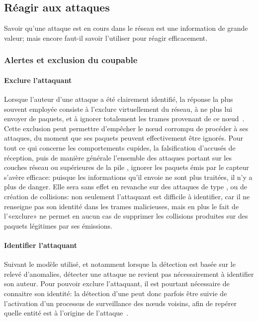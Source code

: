 \subsection{Réagir aux attaques}
Savoir qu'une attaque est en cours dans le réseau est une information de grande valeur; mais encore faut-il savoir l'utiliser pour réagir efficacement.

    \subsubsection{Alertes et exclusion du coupable}
        \paragraph{Exclure l'attaquant}
Lorsque l'auteur d'une attaque a été clairement identifié, la réponse la plus souvent employée consiste à l'exclure virtuellement du réseau, \cad à ne plus lui envoyer de paquets, et à ignorer totalement les trames provenant de ce nœud~\cite{LC08}.
Cette exclusion peut permettre d'empêcher le nœud corrompu de procéder à ses attaques, du moment que ses paquets peuvent effectivement être ignorés.
Pour tout ce qui concerne les comportements cupides, la falsification d'accusés de réception, puis de manière générale l'ensemble des attaques portant sur les couches réseau ou supérieures de la pile \tcpip, ignorer les paquets émis par le capteur s'avère efficace: puisque les informations qu'il envoie ne sont plus traitées, il n'y a plus de danger.
Elle sera sans effet en revanche sur des attaques de type , ou de création de collisions: non seulement l'attaquant est difficile à identifier, car il ne renseigne pas son identité dans les trames malicieuses, mais en plus le fait de l'«exclure» ne permet en aucun cas de supprimer les collisions produites sur des paquets légitimes par ses émissions.

        \paragraph{Identifier l'attaquant}
Suivant le modèle utilisé, et notamment lorsque la détection est basée sur le relevé d'anomalies, détecter une attaque ne revient pas nécessairement à identifier son auteur.
Pour pouvoir exclure l'attaquant, il est pourtant nécessaire de connaitre son identité: la détection d'une  peut donc parfois être suivie de l'activation d'un processus de surveillance des nœuds voisins, afin de repérer quelle entité est à l'origine de l'attaque~\cite{BMS13}.

